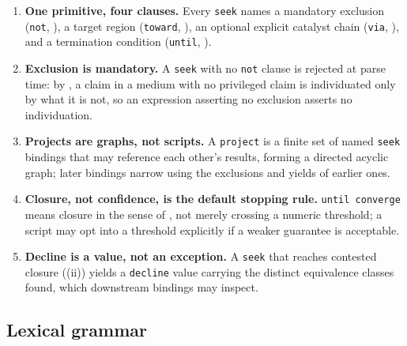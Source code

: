 \documentclass[11pt,twocolumn,a4paper]{article}
\theoremstyle{thmstyle}
\theoremstyle{definition}
\theoremstyle{remark}
\begin{document}
\begin{enumerate}[leftmargin=1.4em,itemsep=2pt]
\item \textbf{One primitive, four clauses.} Every \texttt{seek} names a
mandatory exclusion (\texttt{not}, ), a target region
(\texttt{toward}, ), an optional explicit catalyst chain
(\texttt{via}, ), and a termination condition
(\texttt{until}, ).
\item \textbf{Exclusion is mandatory.} A \texttt{seek} with no
\texttt{not} clause is rejected at parse time: by , a
claim in a medium with no privileged claim is individuated only by what it
is not, so an expression asserting no exclusion asserts no individuation.
\item \textbf{Projects are graphs, not scripts.} A \texttt{project} is a
finite set of named \texttt{seek} bindings that may reference each other's
results, forming a directed acyclic graph; later bindings narrow using
the exclusions and yields of earlier ones.
\item \textbf{Closure, not confidence, is the default stopping rule.}
\texttt{until converge} means closure in the sense of
, not merely crossing a numeric threshold; a script may
opt into a threshold explicitly if a weaker guarantee is acceptable.
\item \textbf{Decline is a value, not an exception.} A \texttt{seek} that
reaches contested closure ((ii)) yields a
\texttt{decline} value carrying the distinct equivalence classes found,
which downstream bindings may inspect.
\end{enumerate}

\subsection{Lexical grammar}
\end{document}

